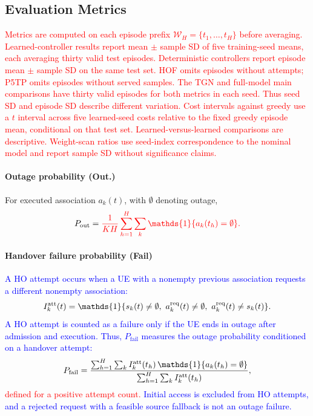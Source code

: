 \documentclass[10pt,letterpaper,journal]{IEEEtran}
\newcommand{\mathbbm}[1]{\mathds{#1}}
\newcommand{\revnew}[1]{\textcolor{red}{#1}}
\begin{document}
\subsection{Evaluation Metrics}
\label{subsec:metrics}

\revnew{Metrics are computed on each episode prefix $\mathcal W_H=\{t_1,\ldots,t_H\}$ before averaging. Learned-controller results report mean $\pm$ sample SD of five training-seed means, each averaging thirty valid test episodes. Deterministic controllers report episode mean $\pm$ sample SD on the same test set. HOF omits episodes without attempts; P5TP omits episodes without served samples. The TGN and full-model main comparisons have thirty valid episodes for both metrics in each seed. Thus seed SD and episode SD describe different variation. Cost intervals against greedy use a $t$ interval across five learned-seed costs relative to the fixed greedy episode mean, conditional on that test set. Learned-versus-learned comparisons are descriptive. Weight-scan ratios use seed-index correspondence to the nominal model and report sample SD without significance claims.}

\paragraph{Outage probability (Out.)}
For executed association $a_k(t)$, with $\emptyset$ denoting outage,
\begin{equation}
P_{\mathrm{out}}
=
\revnew{\frac{1}{KH}\sum_{h=1}^{H}\sum_{k}\mathbbm{1}\{a_k(t_h)=\emptyset\}.}
\label{eq:metric_out}
\end{equation}

\paragraph{Handover failure probability (Fail)}
\textcolor{blue}{A HO attempt occurs when a UE with a nonempty previous association requests a different nonempty association:
\begin{equation}
I_k^{\rm att}(t)
=\mathbbm{1}\{s_k(t)\ne\emptyset,\ a_k^{\rm req}(t)\ne\emptyset,\ a_k^{\rm req}(t)\ne s_k(t)\}. 
\end{equation}
A HO attempt is counted as a failure only if the UE ends in outage after admission and execution.
Thus, $P_{\mathrm{fail}}$ measures the outage probability conditioned on a handover attempt:
\begin{equation}
P_{\mathrm{fail}}
=
\frac{\sum_{h=1}^{H}\sum_k I_k^{\rm att}(t_h)\,\mathbbm{1}\{a_k(t_h)=\emptyset\}}
{\sum_{h=1}^{H}\sum_k I_k^{\rm att}(t_h)},
\label{eq:metric_fail}
\end{equation}}
\revnew{defined for a positive attempt count.}
\textcolor{blue}{Initial access is excluded from HO attempts, and a rejected request with a feasible source fallback is not an outage failure.}
\end{document}
